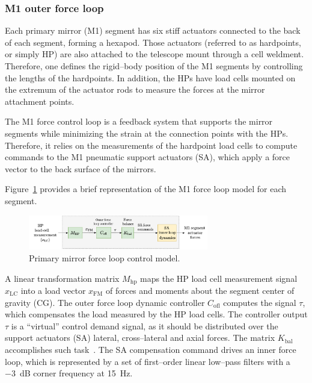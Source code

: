\subsubsection{M1 outer force loop}
\label{sec:m1-ctrlr}


Each primary mirror (M1) segment has six stiff actuators connected to the back of each segment, forming a hexapod. Those actuators (referred to as hardpoints, or simply HP) are also attached to the telescope mount through a cell weldment. Therefore, one defines the rigid--body position of the M1 segments by controlling the lengths of the hardpoints. In addition, the HPs have load cells mounted on the extremum of the actuator rods to measure the forces at the mirror attachment points.


The M1 force control loop is a feedback system that supports the mirror segments while minimizing the strain at the connection points with the HPs. Therefore, it relies on the measurements of the hardpoint load cells to compute commands to the M1 pneumatic support actuators (SA), which apply a force vector to the back surface of the mirrors. %


Figure~\ref{fig:m1_ofl} provides a brief representation of the M1 force loop model for each segment. %
%
\begin{figure}[!hbt]
\centering
\includegraphics[width=0.7\textwidth]{./ctrl_sec_images/M1_local_control.pdf}
\caption{Primary mirror force loop control model.}
\label{fig:m1_ofl}
\end{figure}
%
 A linear transformation matrix $M_\text{hp}$ maps the HP load cell measurement signal $x_\text{LC}$ into a load vector $x_\text{FM}$ of forces and moments about the segment center of gravity (CG). The outer force loop dynamic controller $C_\text{ofl}$ computes the signal $\tau$, which compensates the load measured by the HP load cells. The controller output $\tau$ is a ``virtual'' control demand signal, as it should be distributed over the support actuators (SA) lateral, cross--lateral and axial forces. The matrix $K_\text{bal}$ accomplishes such task~\cite{GMTO.DOC.01498}. The SA compensation command drives an inner force loop, which is represented by a set of first--order linear low--pass filters with a \SI{-3}{dB} corner frequency at \SI{15}{Hz}.

